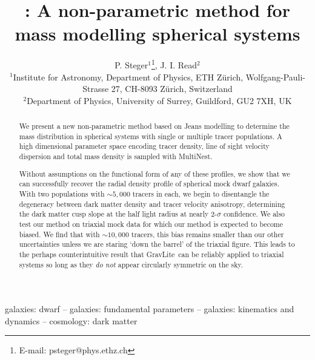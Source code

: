 \documentclass[useAMS,usenatbib,letter]{mn2e}
\title[\GravLite: Non-parametric spherical mass modelling]{\GravLite: A
  non-parametric method for mass modelling spherical systems}
\author[Steger]{P. Steger$^1$\thanks{E-mail: psteger@phys.ethz.ch}, J. I. Read$^{2}$\\
  $^1$Institute for Astronomy, Department of Physics, ETH Z\"urich, Wolfgang-Pauli-Strasse 27, CH-8093 Z\"urich, Switzerland\\
  $^2$Department of Physics, University of Surrey, Guildford, GU2 7XH, UK }
\def\GravLite{{\sc GravLite}}
\def\MultiNest{{\sc MultiNest}}
\begin{document}
\maketitle

\begin{abstract}
    We present a new non-parametric method based on Jeans modelling to
    determine the mass distribution in spherical systems with single
    or multiple tracer populations. A high dimensional parameter space
    encoding tracer density, line of sight velocity dispersion and
    total mass density is sampled with \MultiNest.

    Without assumptions on the functional form of any of these profiles, we show
    that we can successfully recover the radial density profile of spherical
    mock dwarf galaxies. With two populations with $\sim 5,000$ tracers in each,
    we begin to disentangle the degeneracy between dark matter density and
    tracer velocity anisotropy, determining the dark matter cusp slope at the
    half light radius at nearly 2-$\sigma$ confidence. We also test our method
    on triaxial mock data for which our method is expected to become biased. We
    find that with $\sim 10,000$ tracers, this bias remains smaller than our
    other uncertainties unless we are staring `down the barrel' of the triaxial
    figure. This leads to the perhaps counterintuitive result that \GravLite\
    can be reliably applied to triaxial systems so long as they {\it do not}
    appear circularly symmetric on the sky.
\end{abstract}

\begin{keywords} galaxies: dwarf -- galaxies: fundamental parameters
    -- galaxies: kinematics and dynamics -- cosmology: dark matter
\end{keywords}










\end{document}
